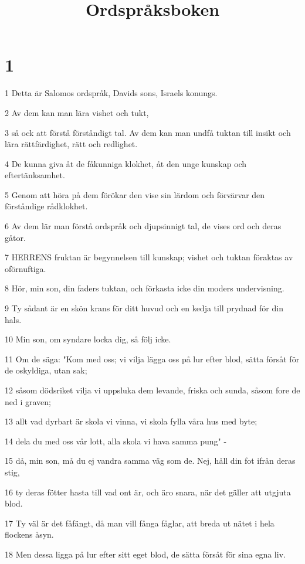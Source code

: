 

\title{Ordspråksboken}


\chapter{1}

\par 1 Detta är Salomos ordspråk, Davids sons, Israels konungs.
\par 2 Av dem kan man lära vishet och tukt,
\par 3 så ock att förstå förståndigt tal. Av dem kan man undfå tuktan till insikt och lära rättfärdighet, rätt och redlighet.
\par 4 De kunna giva åt de fåkunniga klokhet, åt den unge kunskap och eftertänksamhet.
\par 5 Genom att höra på dem förökar den vise sin lärdom och förvärvar den förståndige rådklokhet.
\par 6 Av dem lär man förstå ordspråk och djupsinnigt tal, de vises ord och deras gåtor.
\par 7 HERRENS fruktan är begynnelsen till kunskap; vishet och tuktan föraktas av oförnuftiga.
\par 8 Hör, min son, din faders tuktan, och förkasta icke din moders undervisning.
\par 9 Ty sådant är en skön krans för ditt huvud och en kedja till prydnad för din hals.
\par 10 Min son, om syndare locka dig, så följ icke.
\par 11 Om de säga: "Kom med oss; vi vilja lägga oss på lur efter blod, sätta försåt för de oskyldiga, utan sak;
\par 12 såsom dödsriket vilja vi uppsluka dem levande, friska och sunda, såsom fore de ned i graven;
\par 13 allt vad dyrbart är skola vi vinna, vi skola fylla våra hus med byte;
\par 14 dela du med oss vår lott, alla skola vi hava samma pung" -
\par 15 då, min son, må du ej vandra samma väg som de. Nej, håll din fot ifrån deras stig,
\par 16 ty deras fötter hasta till vad ont är, och äro snara, när det gäller att utgjuta blod.
\par 17 Ty väl är det fåfängt, då man vill fånga fåglar, att breda ut nätet i hela flockens åsyn.
\par 18 Men dessa ligga på lur efter sitt eget blod, de sätta försåt för sina egna liv.
